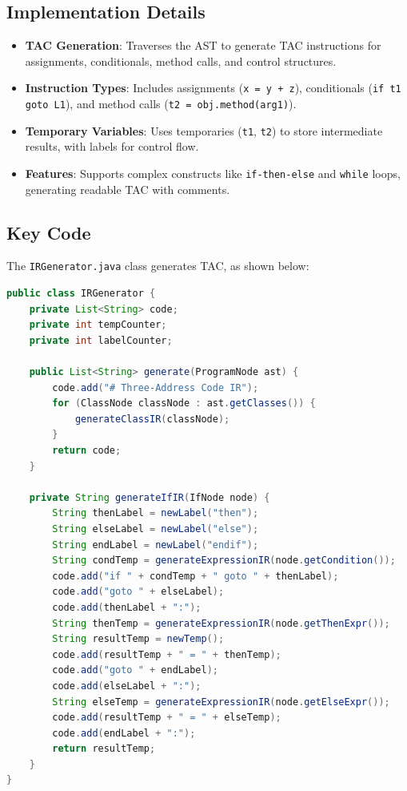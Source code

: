 \documentclass[12pt]{article}
\begin{document}
\subsection{Implementation Details}
\begin{itemize}[itemsep=2pt]
    \item \textbf{TAC Generation}: Traverses the AST to generate TAC instructions for assignments, conditionals, method calls, and control structures.
    \item \textbf{Instruction Types}: Includes assignments (\texttt{x = y + z}), conditionals (\texttt{if t1 goto L1}), and method calls (\texttt{t2 = obj.method(arg1)}).
    \item \textbf{Temporary Variables}: Uses temporaries (\texttt{t1}, \texttt{t2}) to store intermediate results, with labels for control flow.
    \item \textbf{Features}: Supports complex constructs like \texttt{if-then-else} and \texttt{while} loops, generating readable TAC with comments.
\end{itemize}

\subsection{Key Code}
The \texttt{IRGenerator.java} class generates TAC, as shown below:

\begin{lstlisting}[language=Java,caption={Excerpt from IRGenerator.java}]
public class IRGenerator {
    private List<String> code;
    private int tempCounter;
    private int labelCounter;

    public List<String> generate(ProgramNode ast) {
        code.add("# Three-Address Code IR");
        for (ClassNode classNode : ast.getClasses()) {
            generateClassIR(classNode);
        }
        return code;
    }

    private String generateIfIR(IfNode node) {
        String thenLabel = newLabel("then");
        String elseLabel = newLabel("else");
        String endLabel = newLabel("endif");
        String condTemp = generateExpressionIR(node.getCondition());
        code.add("if " + condTemp + " goto " + thenLabel);
        code.add("goto " + elseLabel);
        code.add(thenLabel + ":");
        String thenTemp = generateExpressionIR(node.getThenExpr());
        String resultTemp = newTemp();
        code.add(resultTemp + " = " + thenTemp);
        code.add("goto " + endLabel);
        code.add(elseLabel + ":");
        String elseTemp = generateExpressionIR(node.getElseExpr());
        code.add(resultTemp + " = " + elseTemp);
        code.add(endLabel + ":");
        return resultTemp;
    }
}
\end{lstlisting}
\end{document}
